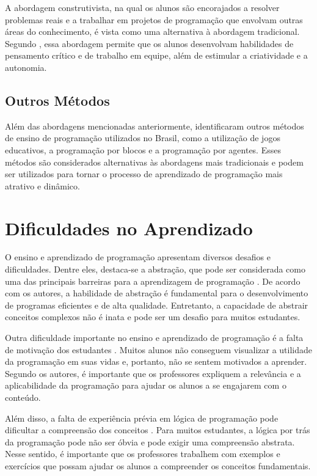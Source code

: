 A abordagem construtivista, na qual os alunos são encorajados a resolver problemas reais e a trabalhar em projetos de programação que envolvam outras áreas do conhecimento, é vista como uma alternativa à abordagem tradicional. Segundo \cite{Silva2018}, essa abordagem permite que os alunos desenvolvam habilidades de pensamento crítico e de trabalho em equipe, além de estimular a criatividade e a autonomia.

\subsection{Outros Métodos}

Além das abordagens mencionadas anteriormente, \cite{Silva2018} identificaram outros métodos de ensino de programação utilizados no Brasil, como a utilização de jogos educativos, a programação por blocos e a programação por agentes. Esses métodos são considerados alternativas às abordagens mais tradicionais e podem ser utilizados para tornar o processo de aprendizado de programação mais atrativo e dinâmico.


\section{Dificuldades no Aprendizado}

O ensino e aprendizado de programação apresentam diversos desafios e dificuldades. Dentre eles, destaca-se a abstração, que pode ser considerada como uma das principais barreiras para a aprendizagem de programação \cite{Silva2014}. De acordo com os autores, a habilidade de abstração é fundamental para o desenvolvimento de programas eficientes e de alta qualidade. Entretanto, a capacidade de abstrair conceitos complexos não é inata e pode ser um desafio para muitos estudantes.

Outra dificuldade importante no ensino e aprendizado de programação é a falta de motivação dos estudantes \cite{Silva2014}. Muitos alunos não conseguem visualizar a utilidade da programação em suas vidas e, portanto, não se sentem motivados a aprender. Segundo os autores, é importante que os professores expliquem a relevância e a aplicabilidade da programação para ajudar os alunos a se engajarem com o conteúdo.

Além disso, a falta de experiência prévia em lógica de programação pode dificultar a compreensão dos conceitos \cite{Silva2014}. Para muitos estudantes, a lógica por trás da programação pode não ser óbvia e pode exigir uma compreensão abstrata. Nesse sentido, é importante que os professores trabalhem com exemplos e exercícios que possam ajudar os alunos a compreender os conceitos fundamentais.

